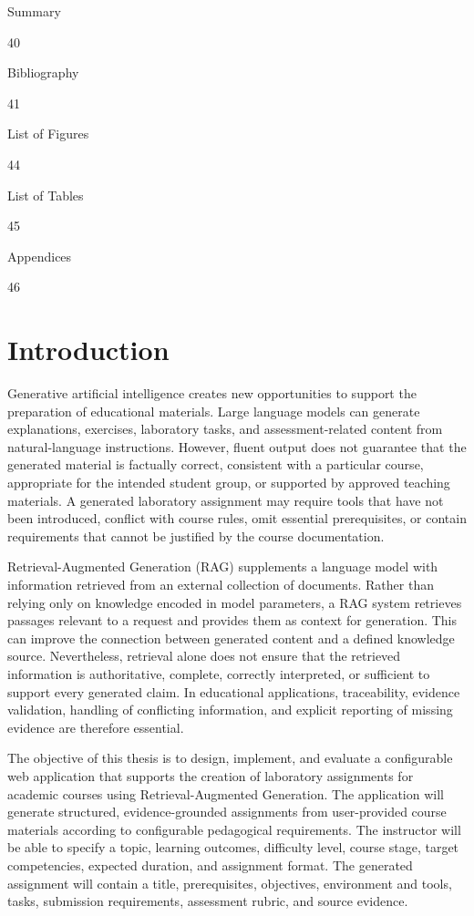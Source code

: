 \documentclass[12pt,a4paper]{report}
\numberwithin{equation}{chapter}
\newcommand{\TOCEntry}[3][0pt]{%
    \noindent
    \hspace*{#1}%
    \parbox[t]{0.80\textwidth}{#2}%
    \hfill
    #3\par
    \vspace{2mm}
}
\begin{document}
\TOCEntry{Summary}{40}
\TOCEntry{Bibliography}{41}
\TOCEntry{List of Figures}{44}
\TOCEntry{List of Tables}{45}
\TOCEntry{Appendices}{46}

\clearpage
{}


\chapter*{Introduction}

Generative artificial intelligence creates new opportunities to support the preparation of educational materials. Large language models can generate explanations, exercises, laboratory tasks, and assessment-related content from natural-language instructions. However, fluent output does not guarantee that the generated material is factually correct, consistent with a particular course, appropriate for the intended student group, or supported by approved teaching materials. A generated laboratory assignment may require tools that have not been introduced, conflict with course rules, omit essential prerequisites, or contain requirements that cannot be justified by the course documentation.

Retrieval-Augmented Generation (RAG) supplements a language model with information retrieved from an external collection of documents. Rather than relying only on knowledge encoded in model parameters, a RAG system retrieves passages relevant to a request and provides them as context for generation. This can improve the connection between generated content and a defined knowledge source. Nevertheless, retrieval alone does not ensure that the retrieved information is authoritative, complete, correctly interpreted, or sufficient to support every generated claim. In educational applications, traceability, evidence validation, handling of conflicting information, and explicit reporting of missing evidence are therefore essential.

The objective of this thesis is to design, implement, and evaluate a configurable web application that supports the creation of laboratory assignments for academic courses using Retrieval-Augmented Generation. The application will generate structured, evidence-grounded assignments from user-provided course materials according to configurable pedagogical requirements. The instructor will be able to specify a topic, learning outcomes, difficulty level, course stage, target competencies, expected duration, and assignment format. The generated assignment will contain a title, prerequisites, objectives, environment and tools, tasks, submission requirements, assessment rubric, and source evidence.
\end{document}
